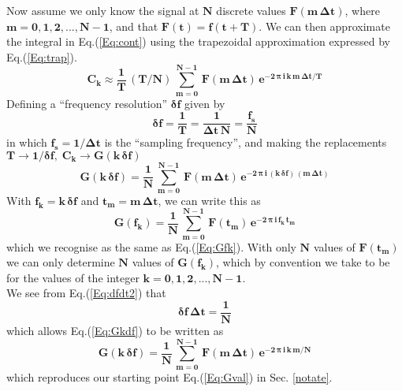 \documentclass[11pt]{article}
\begin{document}
\noindent Now assume we only know the signal at $\mathbf{N}$ discrete values
  $\mathbf{F(m\,\boldsymbol{\Delta}t)}$, where $\mathbf{m = 0,1,2,...,N-1}$,
  and that $\mathbf{F(t) = f(t+T) }$. 
We can then approximate the integral in Eq.(\ref{Eq:cont}) using the trapezoidal
  approximation expressed by Eq.(\ref{Eq:trap}).
\begin{equation}
\mathbf{C_{k} \approx \frac{1}{T}\,(T/N)\,\sum_{m=0}^{N-1}\,F(m\,\boldsymbol{\Delta}t)\,
               e^{- 2\,\boldsymbol{\pi}\,i\,k\,m\,\boldsymbol{\Delta}t/T} }
\end{equation}
Defining a ``frequency resolution'' $\mathbf{\boldsymbol{\delta}f}$ given by 
\begin{equation}   \label{Eq:dfdt2}
\mathbf{\boldsymbol{\delta}f = \frac{1}{T} = \frac{1}{\boldsymbol{\Delta}t\,N} = 
                     \frac{f_{s}}{N} }
\end{equation}
in which $\mathbf{f_{s} = 1/\boldsymbol{\Delta}t}$ is the ``sampling frequency'',
  and making the replacements $\mathbf{T \rightarrow 1/\boldsymbol{\delta}f,\;
    C_{k} \rightarrow G(k\,\boldsymbol{\delta}f)}$
\begin{equation}  \label{Eq:Gkdf}
\mathbf{G(k\,\boldsymbol{\delta}f) = \frac{1}{N}\,\sum_{m=0}^{N-1}\,F(m\,\boldsymbol{\Delta}t)\,
                   e^{- 2\,\boldsymbol{\pi}\,i\,(k\,\boldsymbol{\delta}f)\,(m\,\boldsymbol{\Delta}t)}}
\end{equation}
With $\mathbf{f_{k}} = \mathbf{k\,\boldsymbol{\delta}f}$ 
  and $\mathbf{t_{m}} = \mathbf{m\,\boldsymbol{\Delta}t}$, we can write this as
\begin{equation} 
\mathbf{G(f_{k})} = 
  \mathbf{\frac{1}{N}\,\sum_{m = 0}^{N - 1}\, F(t_{m})\,
               e^{-2\,\boldsymbol{\pi}\,i\,f_{k}\,t_{m}}}
\end{equation}
which we recognise as the same as Eq.(\ref{Eq:Gfk}).
With only $\mathbf{N}$ values of $\mathbf{F(t_{m})}$ we can only determine $\mathbf{N}$
  values of $\mathbf{G(f_{k})}$, which by convention we take to be for the values of
  the integer $\mathbf{k = 0, 1, 2,..., N-1}$.\\
  
\noindent We see from Eq.(\ref{Eq:dfdt2}) that
\begin{equation}
\mathbf{\boldsymbol{\delta}f\,\boldsymbol{\Delta}t = \frac{1}{N} }
\end{equation}
  which allows Eq.(\ref{Eq:Gkdf}) to be written as
\begin{equation}  \label{Eq:Gval3} 
\mathbf{G(k\,\boldsymbol{\delta}f) = \frac{1}{N}\,\sum_{m=0}^{N-1}\,F(m\,\boldsymbol{\Delta}t)\,
                   e^{- 2\,\boldsymbol{\pi}\,i\,k\,m/N }} 
\end{equation}
 which reproduces our starting point Eq.(\ref{Eq:Gval}) in Sec. \ref{notate}.
\end{document}
